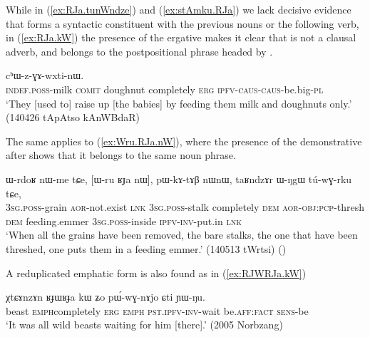 While in (\ref{ex:RJa.tunWndze})  and (\ref{ex:stAmku.RJa}) we lack decisive evidence that  forms a syntactic constituent with the previous nouns or the following verb, in (\ref{ex:RJa.kW}) the presence of the ergative makes it clear that  is not a clausal adverb, and belongs to the postpositional phrase headed by .

\begin{exe}
\ex \label{ex:RJa.kW}
  cʰɯ-z-ɣɤ-wxti-nɯ. \\
 \textsc{indef}.\textsc{poss}-milk \textsc{comit} doughnut completely \textsc{erg} \textsc{ipfv}-\textsc{caus}-\textsc{caus}-be.big-\textsc{pl} \\
\glt `They [used to] raise up [the babies] by feeding them milk and doughnuts only.' (140426 tApAtso kAnWBdaR)
\end{exe}

The same applies to (\ref{ex:Wru.RJa.nW}), where the presence of the demonstrative  after  shows that it belongs to the same noun phrase.

\begin{exe}
\ex \label{ex:Wru.RJa.nW}
 \gll ɯ-rdoʁ nɯ-me tɕe, [ɯ-ru ʁɟa nɯ], pɯ-kɤ-tɤβ nɯnɯ, taʁndzɤr ɯ-ŋgɯ tú-wɣ-rku tɕe, \\
 \textsc{3sg}.\textsc{poss}-grain \textsc{aor}-not.exist \textsc{lnk} \textsc{3sg}.\textsc{poss}-stalk completely \textsc{dem} \textsc{aor}-\textsc{obj}:\textsc{pcp}-thresh \textsc{dem} feeding.emmer \textsc{3sg}.\textsc{poss}-inside \textsc{ipfv}-\textsc{inv}-put.in \textsc{lnk} \\
 \glt `When all the grains have been removed, the bare stalks, the one that have been threshed, one puts them in a feeding emmer.' (140513 tWrtsi)
()
\end{exe}


A reduplicated emphatic form  is also found as in (\ref{ex:RJWRJa.kW})

\begin{exe}
\ex \label{ex:RJWRJa.kW}
 \gll χtɕɤnzɤn ʁɟɯ\redp{}ʁɟa kɯ ʑo pɯ́-wɣ-nɤjo ɕti ɲɯ-ŋu.  \\
beast \textsc{emph}\redp{}completely \textsc{erg} \textsc{emph} \textsc{pst}.\textsc{ipfv}-\textsc{inv}-wait be.\textsc{aff}:\textsc{fact} \textsc{sens}-be \\
\glt `It was all wild beasts waiting for him [there].' (2005 Norbzang)
 \end{exe}
 

